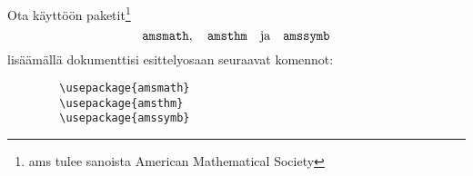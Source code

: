     \begin{harj}
        Ota käyttöön paketit\footnote{ams tulee sanoista American Mathematical Society}
        \[
            \verb-amsmath-,\quad \verb-amsthm-\quad \text{ja}\quad \verb-amssymb-
        \]
        lisäämällä dokumenttisi esittelyosaan seuraavat komennot:
        \begin{verbatim}
        \usepackage{amsmath}
        \usepackage{amsthm}
        \usepackage{amssymb}
        \end{verbatim}
    \end{harj}
